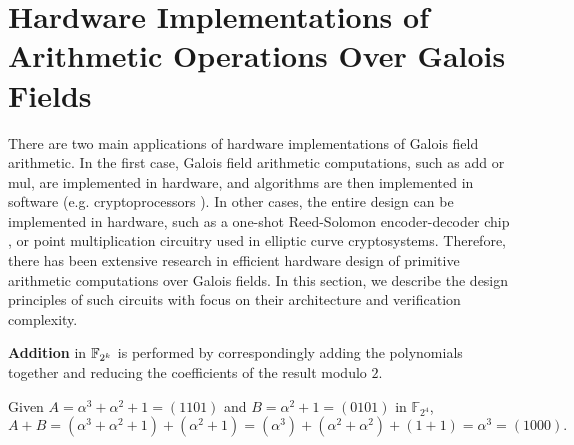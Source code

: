 \section{Hardware Implementations of Arithmetic Operations Over Galois Fields}

There are two main applications of hardware implementations of Galois field 
arithmetic.
In the first case, Galois field arithmetic computations, such as {\sc add or mul},  
are implemented in hardware, and  
algorithms are then implemented in software 
(e.g. cryptoprocessors \cite{ST23} \cite{kobayashi}). 
In other cases, the entire design can be implemented in hardware, such as a one-shot 
Reed-Solomon encoder-decoder chip \cite{reed-solo-chip} \cite{ecc163}, or point 
multiplication circuitry \cite{ecc:software} used in elliptic curve cryptosystems. 
Therefore, there has been extensive research in efficient hardware design of 
primitive arithmetic computations over Galois fields.
In this section, we describe the design principles of such circuits with focus 
on their architecture and verification complexity.

{\bf Addition} in ${\mathbb{F}}_{2^k}$ is performed by correspondingly adding the
polynomials together and reducing the coefficients of the result modulo $2$.
\begin{Example}
Given $A=\alpha^3+\alpha^2+1=(1101) $ and $B=\alpha^2+1=(0101)$ in $\mathbb{F}_{2^4}$, 
\begin{equation}
A+B=(\alpha^3+\alpha^2+1)+(\alpha^2+1)=(\alpha^3) + (\alpha^2+\alpha^2) +(1+1)=\alpha^3=(1000). \nonumber
 \end{equation}
\end{Example}

